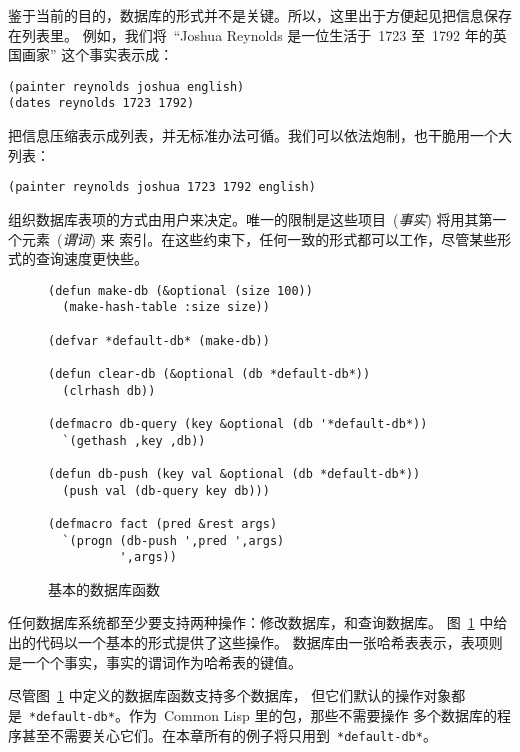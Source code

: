 鉴于当前的目的，数据库的形式并不是关键。所以，这里出于方便起见把信息保存在列表里。
例如，我们将~``Joshua Reynolds 是一位生活于~1723 至~1792 年的英国画家'' 这个事实表示成：
\begin{lstlisting}
(painter reynolds joshua english)
(dates reynolds 1723 1792)
\end{lstlisting}
把信息压缩表示成列表，并无标准办法可循。我们可以依法炮制，也干脆用一个大列表：
\begin{lstlisting}
(painter reynolds joshua 1723 1792 english)
\end{lstlisting}
组织数据库表项的方式由用户来决定。唯一的限制是这些项目~(\emph{事实}) 将用其第一个元素~(\emph{谓词}) 来
索引。在这些约束下，任何一致的形式都可以工作，尽管某些形式的查询速度更快些。

\begin{figure}
\begin{lstlisting}
(defun make-db (&optional (size 100))
  (make-hash-table :size size))

(defvar *default-db* (make-db))

(defun clear-db (&optional (db *default-db*))
  (clrhash db))

(defmacro db-query (key &optional (db '*default-db*))
  `(gethash ,key ,db))

(defun db-push (key val &optional (db *default-db*))
  (push val (db-query key db)))

(defmacro fact (pred &rest args)
  `(progn (db-push ',pred ',args)
          ',args))
\end{lstlisting}
  \caption{基本的数据库函数}
  \label{fig:basic_database_functions}
\end{figure}

任何数据库系统都至少要支持两种操作：修改数据库，和查询数据库。
图~\ref{fig:basic_database_functions} 中给出的代码以一个基本的形式提供了这些操作。
数据库由一张哈希表表示，表项则是一个个事实，事实的谓词作为哈希表的键值。

尽管图~\ref{fig:basic_database_functions} 中定义的数据库函数支持多个数据库，
但它们默认的操作对象都是~\verb|*default-db*|。作为~Common Lisp 里的包，那些不需要操作
多个数据库的程序甚至不需要关心它们。在本章所有的例子将只用到~\texttt{*default-db*}。

